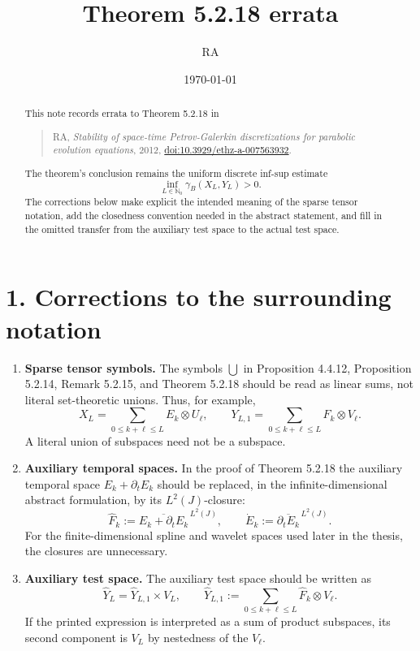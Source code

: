 \documentclass[11pt]{article}
\title{Theorem 5.2.18 errata}
\author{RA}
\date{\today}
\theoremstyle{definition}
\newcommand{\Nzero}{\mathbb N_0}
\newcommand{\dd}{\partial_t}
\newcommand{\gam}{\gamma_B}
\newcommand{\hatF}{\widehat F}
\newcommand{\dotE}{\dot E}
\newcommand{\hatY}{\widehat Y}
\newcommand{\clLtwo}[1]{\overline{#1}^{\,L^2(J)}}
\begin{document}
\maketitle

\begin{abstract}
	\noindent
This note records errata to Theorem 5.2.18 in 
\begin{quote}
RA,
\emph{Stability of space-time Petrov-Galerkin discretizations for
parabolic evolution equations}, 2012,
\href{https://doi.org/10.3929/ethz-a-007563932}{doi:10.3929/ethz-a-007563932}.
\end{quote}
The theorem's conclusion remains the uniform discrete inf-sup estimate
\[
  \inf_{L\in\Nzero}\gam(X_L,Y_L)>0.
\]
The corrections below make explicit the intended meaning of the sparse
tensor notation, add the closedness convention needed in the abstract
statement, and fill in the omitted transfer from the auxiliary test space
to the actual test space.
\end{abstract}

\section*{1. Corrections to the surrounding notation}

\begin{enumerate}[label=\textbf{C\arabic*.},leftmargin=2.5em]
\item \textbf{Sparse tensor symbols.}
The symbols \(\bigcup\) in Proposition 4.4.12, Proposition 5.2.14, Remark 5.2.15, and Theorem 5.2.18 should be read as linear sums, not literal set-theoretic unions.  Thus, for example,
\[
  X_L=\sum_{0\le k+\ell\le L}E_k\otimes U_\ell,
  \qquad
  Y_{L,1}=\sum_{0\le k+\ell\le L}F_k\otimes V_\ell .
\]
A literal union of subspaces need not be a subspace.

\item \textbf{Auxiliary temporal spaces.}
In the proof of Theorem 5.2.18 the auxiliary temporal space \(E_k+\dd E_k\) should be replaced, in the infinite-dimensional abstract formulation, by its \(L^2(J)\)-closure:
\[
  \hatF_k:=\clLtwo{E_k+\dd E_k},
  \qquad
  \dotE_k:=\clLtwo{\dd E_k}.
\]
For the finite-dimensional spline and wavelet spaces used later in the thesis, the closures are unnecessary.

\item \textbf{Auxiliary test space.}
The auxiliary test space should be written as
\[
  \hatY_L=\hatY_{L,1}\times V_L,
  \qquad
  \hatY_{L,1}:=\sum_{0\le k+\ell\le L}\hatF_k\otimes V_\ell .
\]
If the printed expression is interpreted as a sum of product subspaces, its second component is \(V_L\) by nestedness of the \(V_\ell\).
\end{enumerate}
\end{document}
